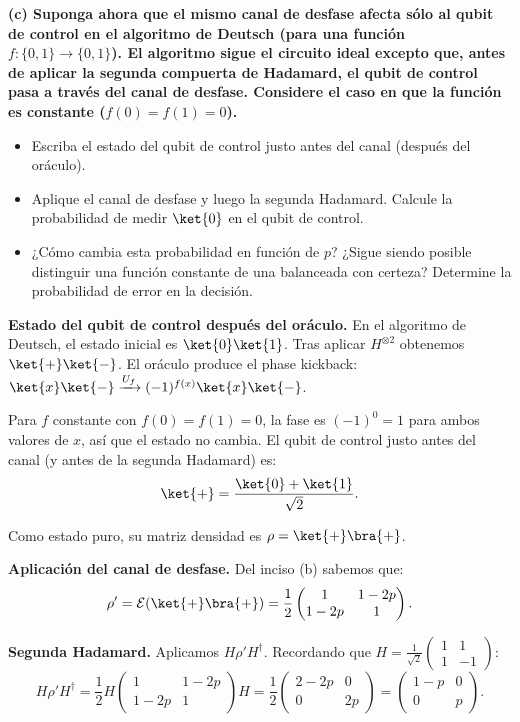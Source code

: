 {\bfseries (c) Suponga ahora que el mismo canal de desfase afecta sólo al qubit de control en el algoritmo de Deutsch (para una función $f:\{0,1\}\to\{0,1\}$). El algoritmo sigue el circuito ideal excepto que, antes de aplicar la segunda compuerta de Hadamard, el qubit de control pasa a través del canal de desfase. Considere el caso en que la función es constante ($f(0)=f(1)=0$).
    \begin{itemize}
        \item Escriba el estado del qubit de control justo antes del canal (después del oráculo).
        \item Aplique el canal de desfase y luego la segunda Hadamard. Calcule la probabilidad de medir $\ket{0}$ en el qubit de control.
        \item ¿Cómo cambia esta probabilidad en función de $p$? ¿Sigue siendo posible distinguir una función constante de una balanceada con certeza? Determine la probabilidad de error en la decisión.
    \end{itemize}
}

\textbf{Estado del qubit de control después del oráculo.} En el algoritmo de Deutsch, el estado inicial es $\ket{0}\ket{1}$. Tras aplicar $H^{\otimes 2}$ obtenemos $\ket{+}\ket{-}$. El oráculo produce el phase kickback: $\ket{x}\ket{-} \xrightarrow{U_f} (-1)^{f(x)}\ket{x}\ket{-}$.

Para $f$ constante con $f(0)=f(1)=0$, la fase es $(-1)^0 = 1$ para ambos valores de $x$, así que el estado no cambia. El qubit de control justo antes del canal (y antes de la segunda Hadamard) es:
$$
    \ket{+} = \frac{\ket{0}+\ket{1}}{\sqrt{2}}.
$$

Como estado puro, su matriz densidad es $\rho = \ket{+}\bra{+}$.

\textbf{Aplicación del canal de desfase.} Del inciso (b) sabemos que:
$$
    \rho' = \mathcal{E}(\ket{+}\bra{+}) = \frac{1}{2}\begin{pmatrix} 1 & 1-2p \\ 1-2p & 1 \end{pmatrix}.
$$

\textbf{Segunda Hadamard.} Aplicamos $H\rho' H^\dagger$. Recordando que $H = \frac{1}{\sqrt{2}}\begin{pmatrix}1 & 1 \\ 1 & -1\end{pmatrix}$:
$$
    H\rho' H^\dagger = \frac{1}{2} H \begin{pmatrix} 1 & 1-2p \\ 1-2p & 1 \end{pmatrix} H = \frac{1}{2}\begin{pmatrix} 2-2p & 0 \\ 0 & 2p \end{pmatrix} = \begin{pmatrix} 1-p & 0 \\ 0 & p \end{pmatrix}.
$$

